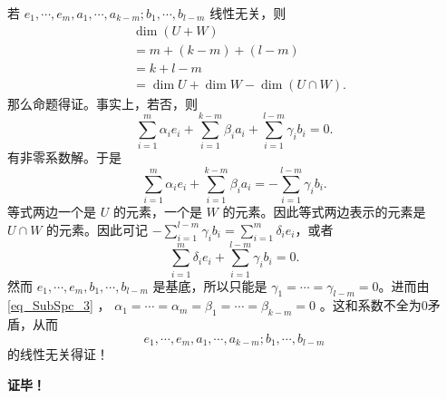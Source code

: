 若 $e_1,\cdots,e_m,a_1,\cdots,a_{k-m};b_1,\cdots,b_{l-m}$ 线性无关，则
\begin{equation}
\begin{aligned}
&\dim (U+W)\\
&=m+(k-m)+(l-m)\\
&=k+l-m\\
&=\dim U+\dim W-\dim(U\cap W).
\end{aligned}~
\end{equation}
那么命题得证。事实上，若否，则
\begin{equation}
\sum_{i=1}^m\alpha_i e_i+\sum_{i=1}^{k-m}\beta_i a_i+\sum_{i=1}^{l-m}\gamma_i b_i=0.~
\end{equation}
有非零系数解。于是
\begin{equation}\label{eq_SubSpc_3}
\sum_{i=1}^m\alpha_i e_i+\sum_{i=1}^{k-m}\beta_i a_i=-\sum_{i=1}^{l-m}\gamma_i b_i.~
\end{equation}
等式两边一个是 $U$ 的元素，一个是 $W$ 的元素。因此等式两边表示的元素是 $U\cap W$ 的元素。因此可记 $-\sum_{i=1}^{l-m}\gamma_i b_i=\sum_{i=1}^m\delta_ie_i$，或者
\begin{equation}
\sum_{i=1}^m\delta_ie_i+\sum_{i=1}^{l-m}\gamma_i b_i=0.~
\end{equation}
然而 $e_1,\cdots,e_m,b_1,\cdots,b_{l-m}$ 是基底，所以只能是 $\gamma_1=\cdots=\gamma_{l-m}=0$。进而由\autoref{eq_SubSpc_3} ， $\alpha_1=\cdots=\alpha_m=\beta_1=\cdots=\beta_{k-m}=0$ 。这和系数不全为0矛盾，从而 
\begin{equation}
e_1,\cdots,e_m,a_1,\cdots,a_{k-m};b_1,\cdots,b_{l-m} ~
\end{equation}
的线性无关得证！







\textbf{证毕！}



